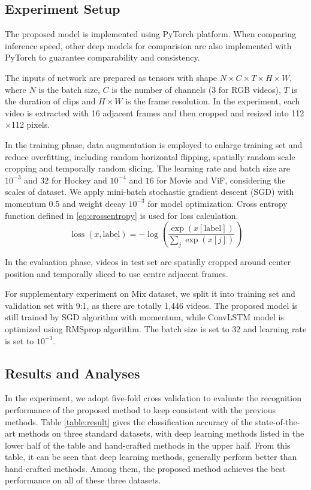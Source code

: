 \documentclass[10pt,twocolumn,letterpaper]{article}
\begin{document}
\subsection{Experiment Setup}

The proposed model is implemented using PyTorch \cite{pytorch} platform. 
When comparing inference speed, other deep models for comparision are also implemented with PyTorch to guarantee comparability and consistency.

The inputs of network are prepared as tensors with shape $N \times C \times T \times H \times W$, where $N$ is the batch size, $C$ is the number of channels (3 for RGB videos), $T$ is the duration of clips and $H \times W$ is the frame resolution. 
In the experiment, each video is extracted with 16 adjacent frames and then cropped and resized into 112$\times$112 pixels.

In the training phase, data augmentation is employed to enlarge training set and reduce overfitting, including random horizontal flipping, spatially random scale cropping and temporally random slicing. 
The learning rate and batch size are $10^{-3}$ and $32$ for Hockey and $10^{-4}$ and $16$ for Movie and ViF, considering the scales of dataset.
We apply mini-batch stochastic gradient descent (SGD) with momentum 0.5 and weight decay $10^{-3}$ for model optimization.  
Cross entropy function defined in \ref{eq:crossentropy} is used for loss calculation. 
\begin{equation}
\label{eq:crossentropy}
\operatorname{loss}(x, \text{label}) = -\log \left(\frac{\exp (x[\text{label}])}{\sum_{j} \exp (x[j])}\right)
\end{equation}

In the evaluation phase, videos in test set are spatially cropped around center position and temporally sliced to use centre adjacent frames.

For supplementary experiment on Mix dataset, we split it into training set and validation set with 9:1, as there are totally 1,446 videos. 
The proposed model is still trained by SGD algorithm with momentum, while ConvLSTM \cite{convlstm_sudh} model is optimized using RMSprop algorithm.
The batch size is set to 32 and learning rate is set to $10^{-3}$.

\subsection{Results and Analyses}

In the experiment, we adopt five-fold cross validation to evaluate the recognition performance of the proposed method to keep consistent with the previous methods.
Table \ref{table:result} gives the classification accuracy of the state-of-the-art methods on three standard datasets, with deep learning methods listed in the lower half of the table and hand-crafted methods in the upper half.
From this table, it can be seen that deep learning methods, generally perform better than hand-crafted methods.
Among them, the proposed method achieves the best performance on all of these three datasets.
\end{document}
